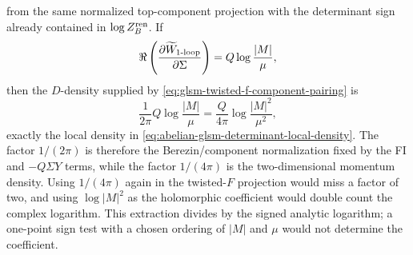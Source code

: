from the same normalized top-component projection with the determinant sign
already contained in \(\log Z_B^{\rm ren}\).  If
\[
  \Re\left(\frac{\partial\widetilde W_{\rm 1\text{-}loop}}
    {\partial\Sigma}\right)
  =
  Q\log\frac{|M|}{\mu},
\]
then the \(D\)-density supplied by
\eqref{eq:glsm-twisted-f-component-pairing} is
\begin{equation}
  \frac1{2\pi}Q\log\frac{|M|}{\mu}
  =
  \frac{Q}{4\pi}\log\frac{|M|^2}{\mu^2},
  \label{eq:glsm-determinant-density-to-twisted-f}
\end{equation}
exactly the local density in
\eqref{eq:abelian-glsm-determinant-local-density}.  The factor \(1/(2\pi)\)
is therefore the Berezin/component normalization fixed by the FI and
\(-Q\Sigma Y\) terms, while the factor \(1/(4\pi)\) is the two-dimensional
momentum density.  Using \(1/(4\pi)\) again in the twisted-\(F\) projection
would miss a factor of two, and using \(\log|M|^2\) as the holomorphic
coefficient would double count the complex logarithm.  This extraction divides
by the signed analytic logarithm; a one-point sign test with a chosen ordering
of \(|M|\) and \(\mu\) would not determine the coefficient.

